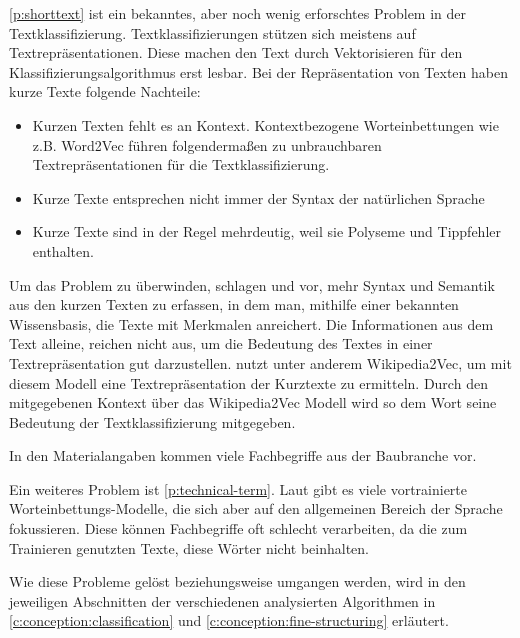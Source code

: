 \autoref{p:shorttext} ist ein bekanntes, aber noch wenig erforschtes Problem in der Textklassifizierung. Textklassifizierungen stützen sich meistens auf Textrepräsentationen. Diese machen den Text durch Vektorisieren für den Klassifizierungsalgorithmus erst lesbar. Bei der Repräsentation von Texten haben kurze Texte folgende Nachteile:

\begin{itemize}
	\setlength\itemsep{0.1em}
	\item Kurzen Texten fehlt es an Kontext. Kontextbezogene Worteinbettungen wie z.B. Word2Vec führen folgendermaßen zu unbrauchbaren Textrepräsentationen für die Textklassifizierung.
	\item Kurze Texte entsprechen nicht immer der Syntax der natürlichen Sprache
	\item Kurze Texte sind in der Regel mehrdeutig, weil sie
	Polyseme und Tippfehler enthalten. \citep[vgl.][]{ijcai2017p406}
\end{itemize}

Um das Problem zu überwinden, schlagen \cite{ijcai2017p406} und \cite{chen2019deep} vor, mehr Syntax und Semantik aus den kurzen Texten zu erfassen, in dem man, mithilfe einer bekannten Wissensbasis, die Texte mit Merkmalen anreichert. Die Informationen aus dem Text alleine, reichen nicht aus, um die Bedeutung des Textes in einer Textrepräsentation gut darzustellen.
\cite{Qingyuan2019} nutzt unter anderem Wikipedia2Vec, um mit diesem Modell eine Textrepräsentation der Kurztexte zu ermitteln. Durch den mitgegebenen Kontext über das Wikipedia2Vec Modell wird so dem Wort seine Bedeutung der Textklassifizierung mitgegeben.

\begin{problem}
	\label{p:technical-term}
	In den Materialangaben kommen viele Fachbegriffe aus der Baubranche vor.
\end{problem}
Ein weiteres Problem ist \autoref{p:technical-term}. Laut \cite{nooralahzadeh2018evaluation} gibt es viele vortrainierte Worteinbettungs-Modelle, die sich aber auf den allgemeinen Bereich der Sprache fokussieren. Diese können Fachbegriffe oft schlecht verarbeiten, da die zum Trainieren genutzten Texte, diese Wörter nicht beinhalten.

Wie diese Probleme gelöst beziehungsweise umgangen werden, wird in den jeweiligen Abschnitten der verschiedenen analysierten Algorithmen in  \autoref{c:conception:classification} und \autoref{c:conception:fine-structuring} erläutert.

